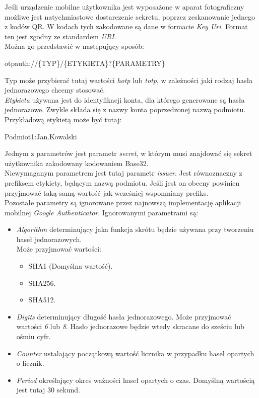 Jeśli urządzenie mobilne użytkownika jest wyposażone w aparat fotograficzny możliwe jest natychmiastowe dostarczenie sekretu, 
poprzez zeskanowanie jednego z kodów QR.
W kodach tych zakodowane są dane w formacie \textit{Key Uri}. 
Format ten jest zgodny ze standardem \textit{URI}. \\
Można go przedstawić w następujący sposób: \\
\centerline{otpauth://\{TYP\}/\{ETYKIETA\}?\{PARAMETRY\}} 
Typ może przybierać tutaj wartości \textit{hotp} lub \textit{totp}, w zależności jaki rodzaj hasła jednorazowego chcemy stosować. \\
\textit{Etykieta} używana jest do identyfikacji konta, dla którego generowane są hasła jednorazowe. 
Zwykle składa się z nazwy konta poprzedzonej nazwą podmiotu. Przykładową etykietą może być tutaj: \\
\centerline{Podmiot1:Jan.Kowalski}
Jednym z parametrów jest parametr \textit{secret}, w którym musi znajdować się sekret użytkownika zakodowany kodowaniem Base32. \\
Niewymaganym parametrem jest tutaj parametr \textit{issuer}. Jest równoznaczny z prefiksem etykiety, będącym nazwą podmiotu. 
Jeśli jest on obecny powinien przyjmować taką samą wartość jak wcześniej wspomniany prefiks. \\
Pozostałe parametry są ignorowane przez najnowszą implementację aplikacji mobilnej \textit{Google Authenticator}.
Ignorowanymi parametrami są: 
\begin{itemize}
	\item \textit{Algorithm} determinujący jaka funkcja skrótu będzie używana przy tworzeniu haseł jednorazowych. \\
		Może przyjmować wartości: 
		\begin{itemize}
			\item SHA1 (Domyślna wartość).
			\item SHA256.
			\item SHA512.
		\end{itemize}
	\item \textit{Digits} determinujący długość hasła jednorazowego. Może przyjmować wartości \textit{6} lub \textit{8}.
		Hasło jednorazowe będzie wtedy skracane do sześciu lub ośmiu cyfr.
	\item \textit{Counter} ustalający początkową wartość licznika w przypadku haseł opartych o licznik.
	\item \textit{Period} określający okres ważności haseł opartych o czas. Domyślną wartością jest tutaj 30 sekund. 
\end{itemize}
